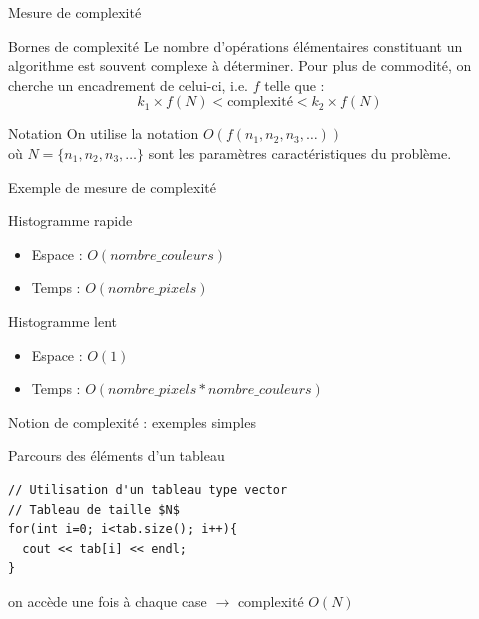 \documentclass{beamer}
\begin{document}
\begin{frame}{Mesure de complexité}

\begin{block}{Bornes de complexité}
    Le nombre d'opérations élémentaires constituant un algorithme est souvent complexe à déterminer. Pour plus de commodité, on cherche un encadrement de celui-ci, i.e. $f$ telle que :
\begin{equation}
k_1 \times f(N) < \text{complexité} < k_2 \times f(N)
\end{equation}
\end{block}

\begin{block}{Notation}
    On utilise la notation $O(f(n_1, n_2, n_3, \hdots))$\\
    où $N = \{n_1, n_2, n_3, \hdots\}$ sont les paramètres caractéristiques du problème.
\end{block}
\end{frame}

\begin{frame}{Exemple de mesure de complexité}
\begin{exampleblock}{Histogramme rapide}
  \begin{itemize}
    \item Espace : $O(nombre\_couleurs)$
    \item Temps : $O(nombre\_pixels)$
  \end{itemize}
\end{exampleblock}

\begin{exampleblock}{Histogramme lent}
    \begin{itemize}
        \item Espace : $O(1)$
        \item Temps : $O(nombre\_pixels * nombre\_couleurs)$
    \end{itemize}
\end{exampleblock}
\end{frame}

\begin{frame}[fragile]{Notion de complexité : exemples simples}
\begin{exampleblock}{Parcours des éléments d'un tableau}
\begin{verbatim}
// Utilisation d'un tableau type vector
// Tableau de taille $N$
for(int i=0; i<tab.size(); i++){
  cout << tab[i] << endl;
}
\end{verbatim}
on accède une fois à chaque case $\rightarrow$ complexité $O(N)$
\end{exampleblock}
\end{frame}
\end{document}
